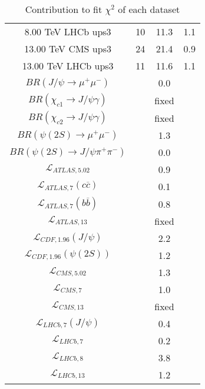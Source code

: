 \begin{table}[h!]
\begin{tabular}{c|c|c|c}
8.00 TeV LHCb ups3 & 10 & 11.3 & 1.1 \\
13.00 TeV CMS ups3 & 24 & 21.4 & 0.9 \\
13.00 TeV LHCb ups3 & 11 & 11.6 & 1.1 \\
\hline
$BR(J/\psi\rightarrow\mu^+\mu^-)$ &  & 0.0 &  \\
$BR(\chi_{c1}\rightarrow J/\psi\gamma)$ &  & fixed & \\
$BR(\chi_{c2}\rightarrow J/\psi\gamma)$ &  & fixed & \\
$BR(\psi(2S)\rightarrow\mu^+\mu^-)$ &  & 1.3 &  \\
$BR(\psi(2S)\rightarrow J/\psi\pi^+\pi^-)$ &  & 0.0 &  \\
$\mathcal L_{ATLAS,5.02}$ &  & 0.9 &  \\
$\mathcal L_{ATLAS,7}(c\overline c)$ &  & 0.1 &  \\
$\mathcal L_{ATLAS,7}(b\overline b)$ &  & 0.8 &  \\
$\mathcal L_{ATLAS,13}$ &  & fixed & \\
$\mathcal L_{CDF,1.96}(J/\psi)$ &  & 2.2 &  \\
$\mathcal L_{CDF,1.96}(\psi(2S))$ &  & 1.2 &  \\
$\mathcal L_{CMS,5.02}$ &  & 1.3 &  \\
$\mathcal L_{CMS,7}$ &  & 1.0 &  \\
$\mathcal L_{CMS,13}$ &  & fixed & \\
$\mathcal L_{LHCb,7}(J/\psi)$ &  & 0.4 &  \\
$\mathcal L_{LHCb,7}$ &  & 0.2 &  \\
$\mathcal L_{LHCb,8}$ &  & 3.8 &  \\
$\mathcal L_{LHCb,13}$ &  & 1.2 &  \\
\end{tabular}
\caption{Contribution to fit $\chi^2$ of each dataset}
\end{table}
